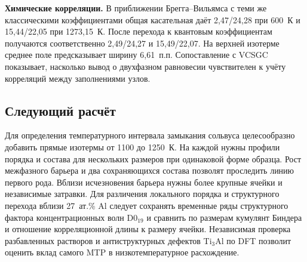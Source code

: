 \documentclass[11pt,a4paper]{article}
\begin{document}
\textbf{Химические корреляции.} В приближении Брегга--Вильямса
с теми же классическими коэффициентами общая касательная даёт
2,47/24,28 при 600~К и 15,44/22,05 при 1273,15~К. После перехода к
квантовым коэффициентам получаются соответственно 2,49/24,27 и
15,49/22,07. На верхней изотерме среднее поле предсказывает ширину
6,61~п.п. Сопоставление с VCSGC показывает, насколько вывод о двухфазном
равновесии чувствителен к учёту корреляций между заполнениями узлов.

\subsection*{Следующий расчёт}
Для определения температурного интервала замыкания сольвуса целесообразно
добавить прямые изотермы от 1100 до 1250~К. На каждой нужны профили
порядка и состава для нескольких размеров при одинаковой форме образца.
Рост межфазного барьера и два сохраняющихся состава позволят проследить
линию первого рода. Вблизи исчезновения барьера нужны более крупные
ячейки и независимые затравки. Для различения локального порядка и
структурного перехода вблизи 27~ат.\% Al следует сохранять временные ряды
структурного фактора концентрационных волн D0$_{19}$ и сравнить по размерам
кумулянт Биндера и отношение корреляционной длины к размеру ячейки. Независимая
проверка разбавленных растворов и антиструктурных дефектов Ti$_3$Al по DFT
позволит оценить вклад самого MTP в низкотемпературное расхождение.

\medskip{}
\end{document}

